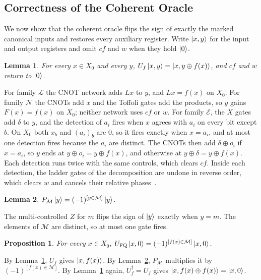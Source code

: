 \documentclass[journal]{IEEEtran}
\newtheorem{lemma}{Lemma}
\newtheorem{proposition}{Proposition}
\newcommand{\Xo}{X_0}
\newcommand{\famE}{\mathcal{E}}
\newcommand{\famL}{\mathcal{L}}
\newcommand{\famN}{\mathcal{N}}
\begin{document}
\subsection{Correctness of the Coherent Oracle}
\label{sec:correctness}

We now show that the coherent oracle flips the sign of exactly the marked
canonical inputs and restores every auxiliary register. Write $\ket{x,y}$ for
the input and output registers and omit $\mathit{cf}$ and $w$ when they hold
$\ket{0}$.

\begin{lemma}\label{lem:uf}
For every $x\in\Xo$ and every $y$, $U_f\ket{x,y}=\ket{x,y\oplus f(x)}$, and
$\mathit{cf}$ and $w$ return to $\ket{0}$.
\end{lemma}
\begin{IEEEproof}
For family $\famL$ the CNOT network adds $Lx$ to $y$, and $Lx=f(x)$ on $\Xo$.
For family $\famN$ the CNOTs add $x$ and the Toffoli gates add the products, so
$y$ gains $F(x)=f(x)$ on $\Xo$; neither network uses $\mathit{cf}$ or $w$. For
family $\famE$, the $X$ gates add $\delta$ to $y$, and the detection of $a_i$
fires when $x$ agrees with $a_i$ on every bit except $b$. On $\Xo$ both $x_b$
and $(a_i)_b$ are 0, so it fires exactly when $x=a_i$, and at most one detection
fires because the $a_i$ are distinct. The CNOTs then add $\delta\oplus o_i$ if
$x=a_i$, so $y$ ends at $y\oplus o_i=y\oplus f(x)$, and otherwise at
$y\oplus\delta=y\oplus f(x)$. Each detection runs twice with the same controls,
which clears $\mathit{cf}$. Inside each detection, the ladder gates of the
decomposition are undone in reverse order, which clears $w$ and cancels their
relative phases~\cite{maslov2016advantages}.
\end{IEEEproof}

\begin{lemma}\label{lem:pm}
$P_{\mathcal{M}}\ket{y}=(-1)^{[y\in\mathcal{M}]}\ket{y}$.
\end{lemma}
\begin{IEEEproof}
The multi-controlled $Z$ for $m$ flips the sign of $\ket{y}$ exactly when
$y=m$. The elements of $\mathcal{M}$ are distinct, so at most one gate fires.
\end{IEEEproof}

\begin{proposition}\label{prop:oracle}
For every $x\in\Xo$, $U_{\mathrm{FQ}}\ket{x,0}=(-1)^{[f(x)\in\mathcal{M}]}\ket{x,0}$.
\end{proposition}
\begin{IEEEproof}
By Lemma~\ref{lem:uf}, $U_f$ gives $\ket{x,f(x)}$. By Lemma~\ref{lem:pm},
$P_{\mathcal{M}}$ multiplies it by $(-1)^{[f(x)\in\mathcal{M}]}$. By
Lemma~\ref{lem:uf} again, $U_f^{\dagger}=U_f$ gives
$\ket{x,f(x)\oplus f(x)}=\ket{x,0}$.
\end{IEEEproof}
\end{document}
